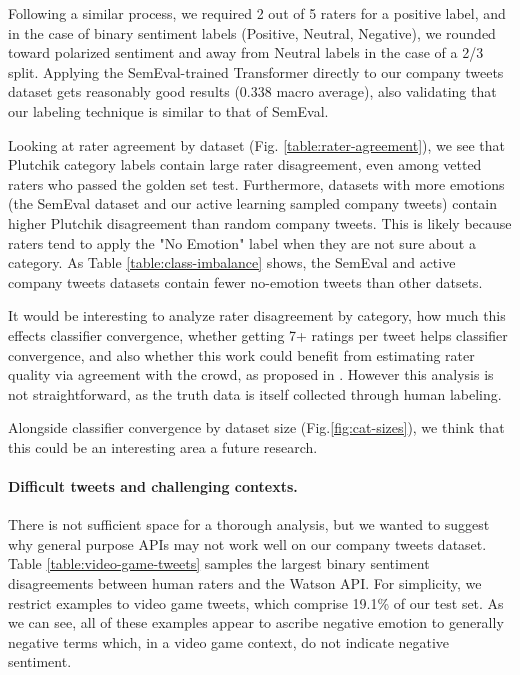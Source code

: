 \documentclass[letterpaper]{article} \usepackage{aaai19}  \usepackage{times}  \usepackage{helvet}  \usepackage{courier}  \usepackage{url}  \usepackage{graphicx}  \usepackage{booktabs}
\begin{document}
Following a similar process, we required 2 out of 5 raters for a positive label, and in the case of binary sentiment labels (Positive, Neutral, Negative), we rounded toward polarized sentiment and away from Neutral labels in the case of a 2/3 split. Applying the SemEval-trained Transformer directly to our company tweets dataset gets reasonably good results (0.338 macro average), also validating that our labeling technique is similar to that of SemEval.   

Looking at rater agreement by dataset (Fig. \ref{table:rater-agreement}), we see that Plutchik category labels contain large rater disagreement, even among vetted raters who passed the golden set test. Furthermore, datasets with more emotions (the SemEval dataset and our active learning sampled company tweets) contain higher Plutchik disagreement than random company tweets. This is likely because raters tend to apply the "No Emotion" label when they are not sure about a category. As Table \ref{table:class-imbalance} shows, the SemEval and active company tweets datasets contain fewer no-emotion tweets than other datsets.

It would be interesting to analyze rater disagreement by category, how much this effects classifier convergence, whether getting 7+ ratings per tweet helps classifier convergence, and also whether this work could benefit from estimating rater quality via agreement with the crowd, as proposed in \cite{NoisyLabelHumanAWS2017}. However this analysis is not straightforward, as the truth data is itself collected through human labeling. 

Alongside classifier convergence by dataset size (Fig.\ref{fig:cat-sizes}), we think that this could be an interesting area a future research.


\paragraph{Difficult tweets and challenging contexts.}
There is not sufficient space for a thorough analysis, but we wanted to suggest why general purpose APIs may not work well on our company tweets dataset. Table \ref{table:video-game-tweets} samples the largest binary sentiment disagreements between human raters and the Watson API. For simplicity, we restrict examples to video game tweets, which comprise 19.1\% of our test set. As we can see, all of these examples appear to ascribe negative emotion to generally negative terms which, in a video game context, do not indicate negative sentiment.
\end{document}
